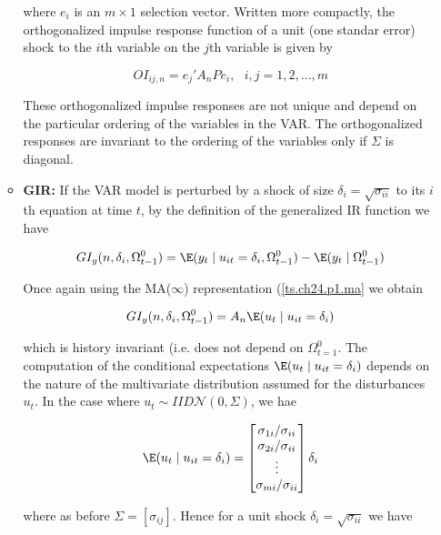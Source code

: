 \begin{enumerate}[(a)]
\begin{itemize}
where \(e_i\) is an \(m \times 1\) selection vector. Written more compactly, the orthogonalized impulse response function of a unit (one standar error) shock to the \(i\)th variable on the \(j\)th variable is given by

\begin{equation}\label{ts.eqn.24.9}
OI_{ij,n} = e_j' A_n P e_i, \ \ \ i, j = 1, 2, \ldots, m
\end{equation}

These orthogonalized impulse responses are not unique and depend on the particular ordering of the variables in the VAR. The orthogonalized responses are invariant to the ordering of the variables only if \(\Sigma\) is diagonal.

 \item \textbf{GIR:} If the VAR model is perturbed by a shock of size \(\delta_i = \sqrt{\sigma_{ii}}\) to its \(i\)th equation at time \(t\), by the definition of the generalized IR function we have

\begin{equation}\label{ts.eqn.24.14}
GI_y(n, \delta_i, \Omega_{t-1}^0) = \E(y_t \mid u_{it} = \delta_i, \Omega_{t-1}^0) - \E(y_t \mid \Omega_{t-1}^0)
\end{equation}

Once again using the MA(\(\infty\)) representation (\ref{ts.ch24.p1.ma} we obtain

\begin{equation}\label{ts.eqn.24.15}
GI_y(n, \delta_i, \Omega_{t-1}^0) =A_n \E(u_t \mid u_{it} = \delta_i)
\end{equation}

which is history invariant (i.e. does not depend on \(\Omega_{t=1}^0\). The computation of the conditional expectations \(\E(u_t \mid u_{it} = \delta_i)\) depends on the nature of the multivariate distribution assumed for the disturbances \(u_t\). In the case where \(u_t \sim IID \mathcal{N}(0, \Sigma)\), we hae

\begin{equation}\label{ts.eqn.24.16}
\E(u_t \mid u_{it} = \delta_i) = \begin{bmatrix} \sigma_{1i}/\sigma_{ii} \\ \sigma_{2i}/\sigma_{ii} \\ \vdots \\ \sigma_{mi}/\sigma_{ii} \end{bmatrix} \delta_i
\end{equation}

where as before \(\Sigma = [\sigma_{ij}]\). Hence for a unit shock \(\delta_i = \sqrt{\sigma_{ii}}\) we have


\end{itemize}
\end{enumerate}
